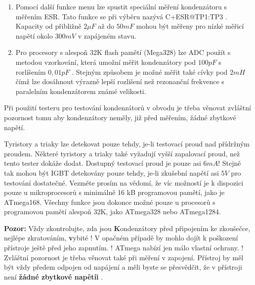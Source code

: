 \begin{enumerate}
\item Pomocí další funkce menu lze spustit speciální měření kondenzátoru s měřením ESR.
Tato funkce se při výběru nazývá \mbox{C+ESR@TP1:TP3} .
 Kapacity od přibližně \(2\mu F\) až do \(50mF\) mohou být měřeny pro nízké měřicí napětí okolo \(300mV\)
 v zapájeném stavu.
\item Pro procesory s alespoň 32K flash pamětí (Mega328) lze ADC použít s metodou vzorkování,
která umožní měřit kondenzátory pod \(100pF\) s rorlíšením  \(0,01pF\) .
Stejným způsobem je možné měřit také cívky pod \(2mH\) čímž lze dosáhnout výrazně lepší rozlišení
než rezonanční frekvence s paralelním kondenzátorem známé velikosti.
\end{enumerate}

 Při použití testeru pro testování kondenzátorů v obvodu je třeba věnovat zvláštní pozornost tomu
  aby kondenzátory neměly, již před měřením, žádné zbytkové napětí.

Tyristory a triaky lze detekovat pouze tehdy, je-li testovací proud nad přídržným proudem.
Některé tyristory a triaky také vyžadují vyšší zapalovací proud, než tento tester dokáže dodat.
Dostupný testovací proud je pouze asi \(6mA\)!
Stejně tak mohou být IGBT detekovány pouze tehdy, je-li zkušební napětí asi \(5V\) pro testování dostatečné.
Vezměte prosím na vědomí, že víc možností je k dispozici pouze u mikroprocesorů s minimálně 16 kB programovou pamětí, jako je ATmega168. 
Všechny funkce jsou dokonce možné pouze u procesorů s programovou pamětí alespoň 32K, jako ATmega328 nebo ATmega1284.

\vspace{1cm}
{\textbf{\Large Pozor:}} Vždy zkontrolujte, zda jsou {\textbf Kondenzátory}  před připojením ke zkoušečce,
nejlépe zkratováním, {\textbf vybité} !
V opačném případě by mohlo dojít k poškození přístroje ještě před jeho zapnutím.
! ATmega nabízí jen málo vlastní ochrany. !
Zvláštní pozornost je třeba věnovat také při měření v zapojení.
Přístroj by měl být vždy předem odpojen od napájení a měli byste se přesvědčit, že v přístroji není {\textbf {žádné zbytkové napětíi}} .
